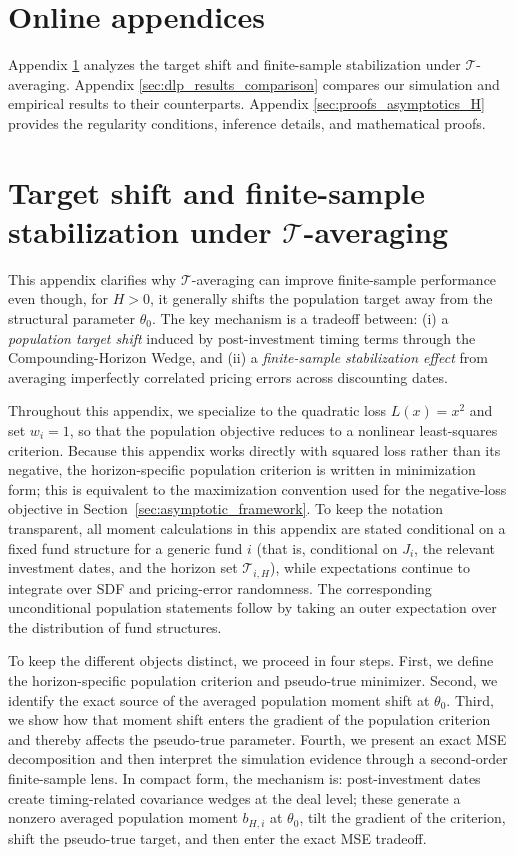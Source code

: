 
\appendix

\section*{Online appendices}

Appendix \ref{sec:appendix_bias_variance} analyzes the target shift and finite-sample stabilization under $\mathcal{T}$-averaging.
Appendix \ref{sec:dlp_results_comparison} compares our simulation and empirical results to their \cite{DLP12} counterparts.
Appendix \ref{sec:proofs_asymptotics_H} provides the regularity conditions, inference details, and mathematical proofs.


\section{Target shift and finite-sample stabilization under $\mathcal{T}$-averaging}
\label{sec:appendix_bias_variance}

This appendix clarifies why $\mathcal{T}$-averaging can improve finite-sample performance even though, for $H>0$, it generally shifts the population target away from the structural parameter $\theta_0$.
The key mechanism is a tradeoff between:
(i) a \emph{population target shift} induced by post-investment timing terms through the Compounding-Horizon Wedge, and
(ii) a \emph{finite-sample stabilization effect} from averaging imperfectly correlated pricing errors across discounting dates.

Throughout this appendix, we specialize to the quadratic loss $L(x)=x^2$ and set $w_i=1$, so that the population objective reduces to a nonlinear least-squares criterion.
Because this appendix works directly with squared loss rather than its negative, the horizon-specific population criterion is written in minimization form; this is equivalent to the maximization convention used for the negative-loss objective in Section~\ref{sec:asymptotic_framework}.
To keep the notation transparent, all moment calculations in this appendix are stated conditional on a fixed fund structure for a generic fund $i$ (that is, conditional on $J_i$, the relevant investment dates, and the horizon set $\mathcal{T}_{i,H}$), while expectations continue to integrate over SDF and pricing-error randomness.
The corresponding unconditional population statements follow by taking an outer expectation over the distribution of fund structures.

To keep the different objects distinct, we proceed in four steps.
First, we define the horizon-specific population criterion and pseudo-true minimizer.
Second, we identify the exact source of the averaged population moment shift at $\theta_0$.
Third, we show how that moment shift enters the gradient of the population criterion and thereby affects the pseudo-true parameter.
Fourth, we present an exact MSE decomposition and then interpret the simulation evidence through a second-order finite-sample lens.
In compact form, the mechanism is: post-investment dates create timing-related covariance wedges at the deal level; these generate a nonzero averaged population moment $b_{H,i}$ at $\theta_0$, tilt the gradient of the criterion, shift the pseudo-true target, and then enter the exact MSE tradeoff.

